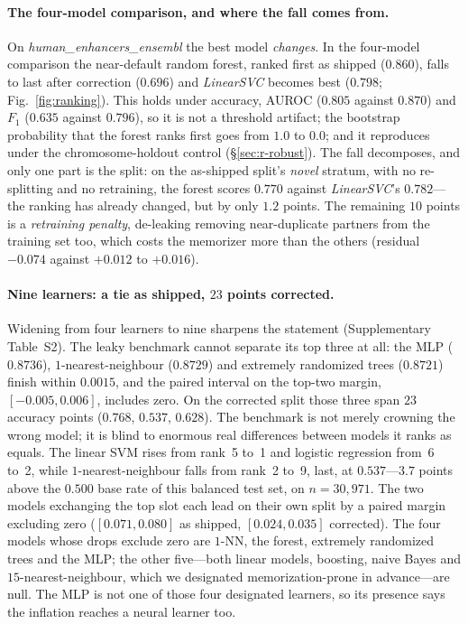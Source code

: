 \documentclass[webpdf,modern,large,namedate]{oup-authoring-template}%
\begin{document}
\paragraph{The four-model comparison, and where the fall comes from.} On \textit{human\_enhancers\_ensembl} the best model \emph{changes}. In the four-model comparison the near-default random forest, ranked first as shipped ($0.860$), falls to last after correction ($0.696$) and \textit{LinearSVC} becomes best ($0.798$; Fig.~\ref{fig:ranking}). This holds under accuracy, AUROC ($0.805$ against $0.870$) and $F_1$ ($0.635$ against $0.796$), so it is not a threshold artifact; the bootstrap probability that the forest ranks first goes from $1.0$ to $0.0$; and it reproduces under the chromosome-holdout control (\S\ref{sec:r-robust}). The fall decomposes, and only one part is the split: on the as-shipped split's \emph{novel} stratum, with no re-splitting and no retraining, the forest scores $0.770$ against \textit{LinearSVC}'s $0.782$---the ranking has already changed, but by only $1.2$ points. The remaining $10$ points is a \emph{retraining penalty}, de-leaking removing near-duplicate partners from the training set too, which costs the memorizer more than the others (residual $-0.074$ against $+0.012$ to $+0.016$).

\paragraph{Nine learners: a tie as shipped, $23$ points corrected.} Widening from four learners to nine sharpens the statement (Supplementary Table~S2). The leaky benchmark cannot separate its top three at all: the MLP ($0.8736$), $1$-nearest-neighbour ($0.8729$) and extremely randomized trees ($0.8721$) finish within $0.0015$, and the paired interval on the top-two margin, $[-0.005,0.006]$, includes zero. On the corrected split those three span $23$ accuracy points ($0.768$, $0.537$, $0.628$). The benchmark is not merely crowning the wrong model; it is blind to enormous real differences between models it ranks as equals. The linear SVM rises from rank~5 to~1 and logistic regression from~6 to~2, while $1$-nearest-neighbour falls from rank~2 to~9, last, at $0.537$---$3.7$ points above the $0.500$ base rate of this balanced test set, on $n=30{,}971$. The two models exchanging the top slot each lead on their own split by a paired margin excluding zero ($[0.071,0.080]$ as shipped, $[0.024,0.035]$ corrected). The four models whose drops exclude zero are $1$-NN, the forest, extremely randomized trees and the MLP; the other five---both linear models, boosting, naive Bayes and $15$-nearest-neighbour, which we designated memorization-prone in advance---are null. The MLP is not one of those four designated learners, so its presence says the inflation reaches a neural learner too.
\end{document}
